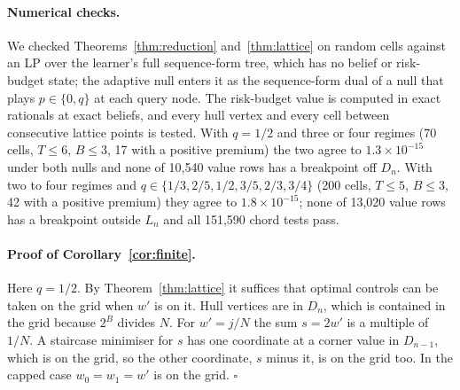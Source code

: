 \documentclass{article}
\theoremstyle{plain}
\theoremstyle{definition}
\theoremstyle{remark}
\begin{document}
\paragraph{Numerical checks.} We checked Theorems~\ref{thm:reduction} and~\ref{thm:lattice} on random cells against an LP over the learner's full sequence-form tree, which has no belief or risk-budget state; the adaptive null enters it as the sequence-form dual of a null that plays $p\in\{0,q\}$ at each query node. The risk-budget value is computed in exact rationals at exact beliefs, and every hull vertex and every cell between consecutive lattice points is tested. With $q=1/2$ and three or four regimes (70 cells, $T\le6$, $B\le3$, 17 with a positive premium) the two agree to $1.3\times10^{-15}$ under both nulls and none of 10{,}540 value rows has a breakpoint off $D_n$. With two to four regimes and $q\in\{1/3,2/5,1/2,3/5,2/3,3/4\}$ (200 cells, $T\le5$, $B\le3$, 42 with a positive premium) they agree to $1.8\times10^{-15}$; none of 13{,}020 value rows has a breakpoint outside $L_n$ and all 151{,}590 chord tests pass.

\paragraph{Proof of Corollary~\ref{cor:finite}.} Here $q=1/2$. By Theorem~\ref{thm:lattice} it suffices that optimal controls can be taken on the grid when $w'$ is on it. Hull vertices are in $D_n$, which is contained in the grid because $2^B$ divides $N$. For $w'=j/N$ the sum $s=2w'$ is a multiple of $1/N$. A staircase minimiser for $s$ has one coordinate at a corner value in $D_{n-1}$, which is on the grid, so the other coordinate, $s$ minus it, is on the grid too. In the capped case $w_0=w_1=w'$ is on the grid. \hfill$\square$
\end{document}
